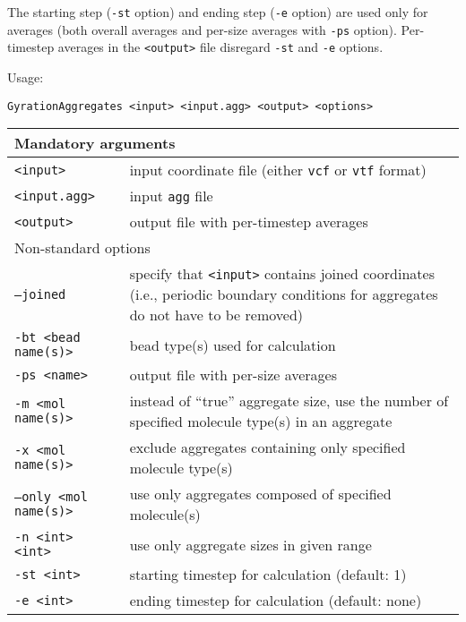 The starting step (\texttt{-st} option) and ending step (\texttt{-e}
option) are used only for averages (both overall averages and per-size
averages with \texttt{-ps} option). Per-timestep averages in the
\texttt{<output>} file disregard \texttt{-st} and \texttt{-e} options.

Usage:

\vspace{1em}
\noindent
\texttt{GyrationAggregates <input> <input.agg> <output> <options>}

\noindent
\begin{longtable}{p{}p{}}
  \toprule
  \multicolumn{2}{l}{Mandatory arguments} \\
  \midrule
  \texttt{<input>} & input coordinate file (either \texttt{vcf} or
    \texttt{vtf} format) \\
  \texttt{<input.agg>} & input \texttt{agg} file \\
  \texttt{<output>} & output file with per-timestep averages \\
  \toprule
  \multicolumn{2}{l}{Non-standard options} \\
  \midrule
  \texttt{--joined} & specify that \texttt{<input>} contains joined
    coordinates (i.e., periodic boundary conditions for aggregates do not
    have to be removed) \\
  \texttt{-bt <bead name(s)>} & bead type(s) used for calculation \\
  \texttt{-ps <name>} & output file with per-size averages \\
  \texttt{-m <mol name(s)>} & instead of \enquote{true} aggregate size, use
    the number of specified molecule type(s) in an aggregate \\
  \texttt{-x <mol name(s)>} & exclude aggregates containing only specified
    molecule type(s) \\
  \texttt{--only <mol name(s)>} & use only aggregates composed of specified
    molecule(s) \\
  \texttt{-n <int> <int>} & use only aggregate sizes in given range \\
  \texttt{-st <int>} & starting timestep for calculation (default: 1) \\
  \texttt{-e <int>} & ending timestep for calculation (default: none) \\
  \bottomrule
\end{longtable}

